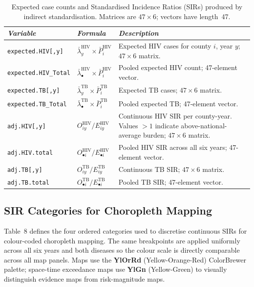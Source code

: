 \documentclass[11pt,a4paper]{article}
\newcommand{\code}[1]{\texttt{\small #1}}
\begin{document}
\begin{table}[H]
\caption{Expected case counts and Standardised Incidence Ratios (SIRs) produced by indirect standardisation. Matrices are $47\times6$; vectors have length~47.}
\renewcommand{\arraystretch}{1.10}
\scriptsize\begin{tabularx}{\textwidth}{@{}L{3.8cm}L{5.2cm}X@{}}
\toprule
\textit{Variable} & \textit{Formula} & \textit{Description}\\
\midrule
\code{expected.HIV[,y]}
  & $\bar{\lambda}^{\mathrm{HIV}}_y\times\bar{P}^{\mathrm{HIV}}_i$
  & Expected HIV cases for county $i$, year $y$; $47\times6$ matrix.\\
\code{expected.HIV\_Total}
  & $\bar{\lambda}^{\mathrm{HIV}}_\bullet\times\bar{P}^{\mathrm{HIV}}_i$
  & Pooled expected HIV count; 47-element vector.\\
\code{expected.TB[,y]}
  & $\bar{\lambda}^{\mathrm{TB}}_y\times\bar{P}^{\mathrm{TB}}_i$
  & Expected TB cases; $47\times6$ matrix.\\
\code{expected.TB\_Total}
  & $\bar{\lambda}^{\mathrm{TB}}_\bullet\times\bar{P}^{\mathrm{TB}}_i$
  & Pooled expected TB; 47-element vector.\\[4pt]
\code{adj.HIV[,y]}
  & $O^{\mathrm{HIV}}_{iy}/E^{\mathrm{HIV}}_{iy}$
  & Continuous HIV SIR per county-year. Values $>1$ indicate above-national-average burden; $47\times6$ matrix.\\
\code{adj.HIV.total}
  & $O^{\mathrm{HIV}}_{\bullet i}/E^{\mathrm{HIV}}_{\bullet i}$
  & Pooled HIV SIR across all six years; 47-element vector.\\
\code{adj.TB[,y]}
  & $O^{\mathrm{TB}}_{iy}/E^{\mathrm{TB}}_{iy}$
  & Continuous TB SIR; $47\times6$ matrix.\\
\code{adj.TB.total}
  & $O^{\mathrm{TB}}_{\bullet i}/E^{\mathrm{TB}}_{\bullet i}$
  & Pooled TB SIR; 47-element vector.\\
\bottomrule
\end{tabularx}
\renewcommand{\arraystretch}{1.10}
\end{table}

\subsection{SIR Categories for Choropleth Mapping}

Table~8 defines the four ordered categories used to discretise continuous
SIRs for colour-coded choropleth mapping. The same breakpoints are applied
uniformly across all six years and both diseases so the colour scale is
directly comparable across all map panels. Maps use the \textbf{YlOrRd}
(Yellow-Orange-Red) ColorBrewer palette; space-time exceedance maps use
\textbf{YlGn} (Yellow-Green) to visually distinguish evidence maps from
risk-magnitude maps.
\end{document}
